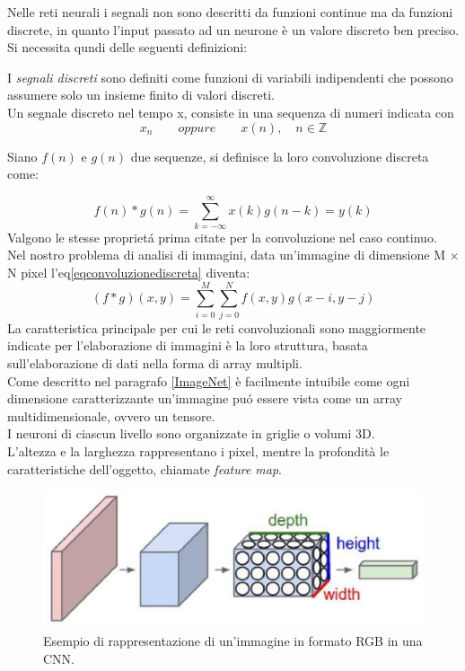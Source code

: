 \documentclass[a4paper,12pt]{report}
\begin{document}
Nelle reti neurali i segnali non sono descritti da funzioni continue ma da funzioni discrete, in quanto l'input passato ad un neurone \`e un valore discreto ben preciso.\\
Si necessita qundi delle seguenti definizioni:
\begin{defin}
I \textit{segnali discreti} sono definiti come funzioni di variabili indipendenti che possono assumere solo un insieme finito di valori discreti.\\
Un segnale discreto nel tempo x, consiste in una sequenza di numeri indicata con 
$$x_n \qquad oppure \qquad x(n) ,\quad n\in \mathbb{Z}$$
\end{defin}
\begin{defin}
Siano $f(n)$ e $g(n)$ due sequenze, si definisce la loro convoluzione discreta come:
\end{defin}
\begin{equation} \label{eqconvoluzionediscreta}
f(n)*g(n)=\sum_{k=-\infty}^{\infty}x(k)g(n-k)=y(k)
\end{equation}
Valgono le stesse propriet\'{a} prima citate per la convoluzione nel caso continuo. Nel nostro problema di analisi di immagini, data un'immagine di dimensione M $\times$ N pixel l'eq\ref{eqconvoluzionediscreta} diventa:
\begin{equation}
(f*g)(x,y)=\sum_{i=0}^M \sum_{j=0}^N f(x,y)g(x-i,y-j)
\end{equation}
La caratteristica principale per cui le reti convoluzionali sono maggiormente indicate per l'elaborazione di immagini \`e la loro struttura, basata sull'elaborazione di dati nella forma di array multipli.\\
Come descritto nel paragrafo \ref{ImageNet} \`e facilmente intuibile come ogni dimensione caratterizzante un'immagine pu\'{o} essere vista come un array multidimensionale, ovvero un tensore.\\
I neuroni di ciascun livello sono organizzate in griglie o volumi 3D.\\
L'altezza e la larghezza rappresentano i pixel, mentre la profondit\`{a} le caratteristiche dell'oggetto, chiamate \textit{feature map}.
\begin{figure}[!h]
\centering
\includegraphics{Immagine3D}
\caption{Esempio di rappresentazione di un'immagine in formato RGB in una CNN.}
\end{figure}
\end{document}
